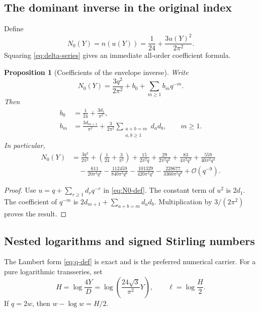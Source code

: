 \documentclass[11pt]{article}
\numberwithin{equation}{section}
\theoremstyle{mainthm}
\newtheorem{proposition}[theorem]{Proposition}
\theoremstyle{defstyle}
\theoremstyle{remark}
\newcommand{\cO}{\mathcal O}
\begin{document}
\subsection{The dominant inverse in the original index}

Define
\begin{equation}\label{eq:N0-def}
 N_0(Y)=n(u(Y))=\frac1{24}+\frac{3u(Y)^2}{2\pi^2}.
\end{equation}
Squaring \eqref{eq:delta-series} gives an immediate all-order coefficient formula.

\begin{proposition}[Coefficients of the envelope inverse]\label{prop:N0-q-coefficients}
Write
\begin{equation}\label{eq:N0-q-general}
 N_0(Y)=\frac{3q^2}{2\pi^2}+b_0+\sum_{m\ge1}b_mq^{-m}.
\end{equation}
Then
\begin{align}
 b_0&=\frac1{24}+\frac{3d_1}{\pi^2},\label{eq:b0}\\
 b_m&=\frac{3d_{m+1}}{\pi^2}
 +\frac{3}{2\pi^2}\sum_{\substack{a+b=m\\a,b\ge1}}d_ad_b,
 \qquad m\ge1.
 \label{eq:bm}
\end{align}
In particular,
\begin{align}
 N_0(Y)
 &=\frac{3q^2}{2\pi^2}
 +\left(\frac1{24}+\frac3{\pi^2}\right)
 +\frac{15}{2\pi^2q}
 +\frac{29}{2\pi^2q^2}
 +\frac{83}{4\pi^2q^3}
 +\frac{559}{40\pi^2q^4}\nonumber\\
 &\quad-\frac{611}{20\pi^2q^5}
 -\frac{112459}{840\pi^2q^6}
 -\frac{101329}{420\pi^2q^7}
 -\frac{228677}{3360\pi^2q^8}
 +\cO(q^{-9}).
 \label{eq:N0-q-expanded}
\end{align}
\end{proposition}

\begin{proof}
Use \(u=q+\sum_{r\ge1}d_rq^{-r}\) in \eqref{eq:N0-def}.  The constant term of \(u^2\) is \(2d_1\).  The coefficient of \(q^{-m}\) is
\(
 2d_{m+1}+\sum_{a+b=m}d_ad_b.
\)
Multiplication by \(3/(2\pi^2)\) proves the result.
\end{proof}

\subsection{Nested logarithms and signed Stirling numbers}

The Lambert form \eqref{eq:q-def} is exact and is the preferred numerical carrier.  For a pure logarithmic transseries, set
\begin{equation}\label{eq:H-ell-def}
 H=\log\frac{4Y}{D}
 =\log\left(\frac{24\sqrt3}{\pi^2}Y\right),
 \qquad
 \ell=\log\frac H2.
\end{equation}
If \(q=2w\), then \(w-\log w=H/2\).
\end{document}
